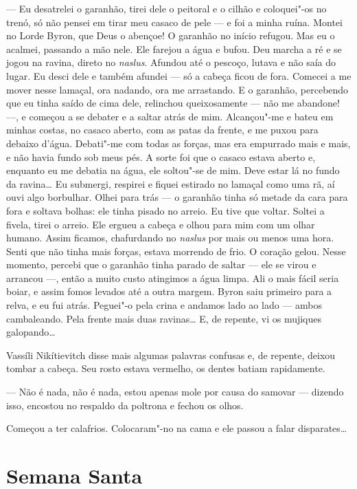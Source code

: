 --- Eu desatrelei o garanhão, tirei dele o peitoral e o cilhão e
coloquei"-os no trenó, só não pensei em tirar meu casaco de pele --- e
foi a minha ruína. Montei no Lorde Byron, que Deus o abençoe! O garanhão
no início refugou. Mas eu o acalmei, passando a mão nele. Ele farejou a
água e bufou. Deu marcha a ré e se jogou na ravina, direto no
\emph{naslus}. Afundou até o pescoço, lutava e não saía do lugar. Eu
desci dele e também afundei --- só a cabeça ficou de fora. Comecei a me
mover nesse lamaçal, ora nadando, ora me arrastando. E o garanhão,
percebendo que eu tinha saído de cima dele, relinchou queixosamente ---
não me abandone! ---, e começou a se debater e a saltar atrás de mim.
Alcançou"-me e bateu em minhas costas, no casaco aberto, com as patas da
frente, e me puxou para debaixo d'água. Debati"-me com todas as forças,
mas era empurrado mais e mais, e não havia fundo sob meus pés. A sorte
foi que o casaco estava aberto e, enquanto eu me debatia na água, ele
soltou"-se de mim. Deve estar lá no fundo da ravina\ldots{} Eu submergi,
respirei e fiquei estirado no lamaçal como uma rã, aí ouvi algo borbulhar.
Olhei para trás --- o garanhão tinha só metade da cara para fora e
soltava bolhas: ele tinha pisado no arreio. Eu tive que voltar. Soltei a
fivela, tirei o arreio. Ele ergueu a cabeça e olhou para mim com um
olhar humano. Assim ficamos, chafurdando no \emph{naslus} por mais ou
menos uma hora. Senti que não tinha mais forças, estava morrendo de
frio. O coração gelou. Nesse momento, percebi que o garanhão tinha
parado de saltar --- ele se virou e arrancou ---, então a muito custo
atingimos a água limpa. Ali o mais fácil seria boiar, e assim fomos
levados até a outra margem. Byron saiu primeiro para a relva, e eu fui
atrás. Peguei"-o pela crina e andamos lado ao lado --- ambos cambaleando.
Pela frente mais duas ravinas\ldots{} E, de repente, vi os mujiques
galopando\ldots{}

Vassíli Nikítievitch disse mais algumas palavras confusas e, de repente,
deixou tombar a cabeça. Seu rosto estava vermelho, os dentes batiam
rapidamente.

--- Não é nada, não é nada, estou apenas mole por causa do samovar ---
dizendo isso, encostou no respaldo da poltrona e fechou os olhos.

Começou a ter calafrios. Colocaram"-no na cama e ele passou a falar
disparates\ldots{}

\chapter{Semana Santa}


